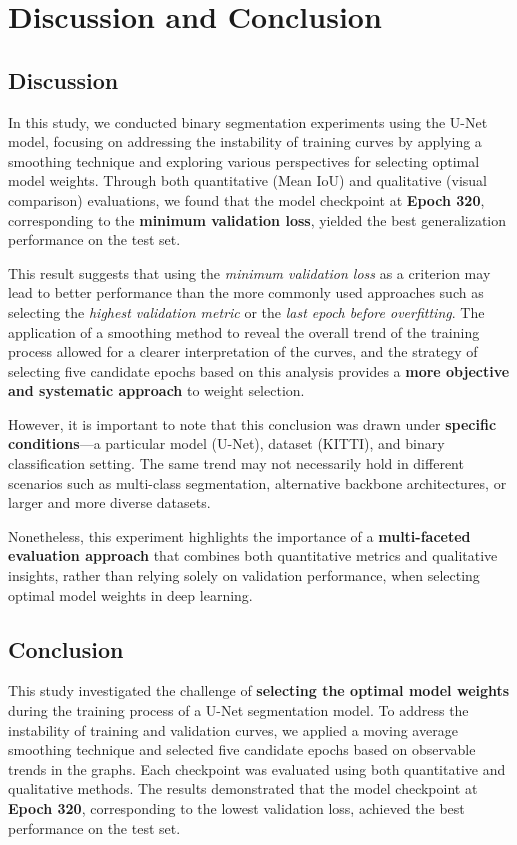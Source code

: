 \documentclass{article}
\begin{document}
\section{Discussion and Conclusion}

\subsection{Discussion}

In this study, we conducted binary segmentation experiments using the U-Net model, focusing on addressing the instability of training curves by applying a smoothing technique and exploring various perspectives for selecting optimal model weights. Through both quantitative (Mean IoU) and qualitative (visual comparison) evaluations, we found that the model checkpoint at \textbf{Epoch 320}, corresponding to the \textbf{minimum validation loss}, yielded the best generalization performance on the test set.

This result suggests that using the \emph{minimum validation loss} as a criterion may lead to better performance than the more commonly used approaches such as selecting the \emph{highest validation metric} or the \emph{last epoch before overfitting}. The application of a smoothing method to reveal the overall trend of the training process allowed for a clearer interpretation of the curves, and the strategy of selecting five candidate epochs based on this analysis provides a \textbf{more objective and systematic approach} to weight selection.

However, it is important to note that this conclusion was drawn under \textbf{specific conditions}---a particular model (U-Net), dataset (KITTI), and binary classification setting. The same trend may not necessarily hold in different scenarios such as multi-class segmentation, alternative backbone architectures, or larger and more diverse datasets.

Nonetheless, this experiment highlights the importance of a \textbf{multi-faceted evaluation approach} that combines both quantitative metrics and qualitative insights, rather than relying solely on validation performance, when selecting optimal model weights in deep learning.

\subsection{Conclusion}

This study investigated the challenge of \textbf{selecting the optimal model weights} during the training process of a U-Net segmentation model. To address the instability of training and validation curves, we applied a moving average smoothing technique and selected five candidate epochs based on observable trends in the graphs. Each checkpoint was evaluated using both quantitative and qualitative methods. The results demonstrated that the model checkpoint at \textbf{Epoch 320}, corresponding to the lowest validation loss, achieved the best performance on the test set.
\end{document}
